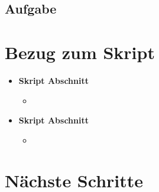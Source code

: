 \documentclass{article}
\begin{document}
\subsection{Aufgabe}


\section{Bezug zum Skript}

\begin{itemize}
	\item \textbf{Skript Abschnitt}
		\begin{itemize}
			\item 
		\end{itemize}
	\item \textbf{Skript Abschnitt}
		\begin{itemize}
			\item 
		\end{itemize}
\end{itemize}
 
\section{Nächste Schritte}
\end{document}
